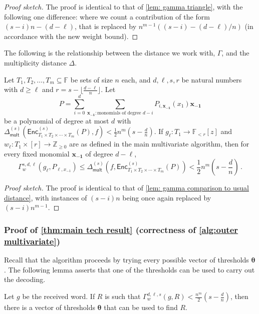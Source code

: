 \documentclass{article}
\def\Integer{\mathbb{Z}}
\def\Field{\mathbb{F}}
\let\Z\Integer
\let\F\Field
\newcommand{\enc}{{\mathsf{Enc}}}
\newcommand{\Delm}{\Delta_{\mathsf{mult}}}
\newcommand{\thetabar}{{\boldsymbol{\theta}}}
\begin{document}
	\begin{proof}[Proof sketch]
		The proof is identical to that of \cref{lem: gamma triangle}, with the following one difference: where we count a contribution of the form $(s-i)n - (d-\ell)$, that is replaced by $n^{m-1} ((s-i)-(d-\ell)/n)$ (in accordance with the new weight bound). 
	\end{proof}
	
	The following is the relationship between the distance we work with, $\Gamma$, and the multiplicity distance $\Delta$. 
	
	\begin{lemma}
		Let $T_1, T_2, \dotsc, T_m \subseteq \F$ be sets of size $n$ each, and $d, \ell, s, r$ be natural numbers with $d \geq \ell$ and $r = s - \lfloor \frac{d-\ell}{n} \rfloor$. Let 
		\[P = \sum_{i = 0}^d \sum_{\mathbf{x_{-1}} \colon \text{monomials of degree } d-i} P_{i, \mathbf{x_{-1}}}(x_1) \mathbf{x_{-1}} \] 
		be a polynomial of degree at most $d$ with $\Delm^{(s)}(\enc^{(s)}_{T_1\times T_2 \times \dotsb \times T_m}(P), f) < \frac{1}{2} n^m (s-\frac{d}{n})$. If $g_{\ell}\colon  T_1 \to \F_{<r}[z]$ and $w_{\ell}\colon  T_1 \times [r] \to \Z_{\geq 0}$ are  as defined in the main multivariate algorithm, then for every fixed monomial $\mathbf{x_{-1}}$ of degree $d-\ell$,
		\[
		\Gamma_{w}^{s, d, \ell}(g_{\ell}, P_{\ell, x_{-1}}) \leq \Delm^{(s)}(f, \enc^{(s)}_{T_1\times T_2 \times \dotsb \times T_m }(P)) < \frac{1}{2}n^m\left(s - \frac{d}{n}\right) \, .
		\]
	\end{lemma}
	
	\begin{proof}[Proof sketch]
		The proof is identical to that of \cref{lem: gamma comparison to usual distance}, with instances of $(s-i)n$ being once again replaced by $(s-i)n^{m-1}$. 
	\end{proof}
	
	\subsubsection{Proof of \texorpdfstring{\cref{thm:main tech result}}{Theorem 3.9} (correctness of \texorpdfstring{\cref{alg:outer multivariate}}{Algorithm 4})}
	
	Recall that the algorithm proceeds by trying every possible vector of thresholds $\thetabar$. The following lemma asserts that one of the thresholds can be used to carry out the decoding.
	
	\begin{lemma}
		Let $g$ be the received word. If $R$ is such that $\Gamma_w^{d, \ell, s}(g, R) < \frac{n^m}{2}(s-\frac{d}{n})$, then there is a vector of thresholds $\thetabar$ that can be used to find $R$.
	\end{lemma}
	
\end{document}
